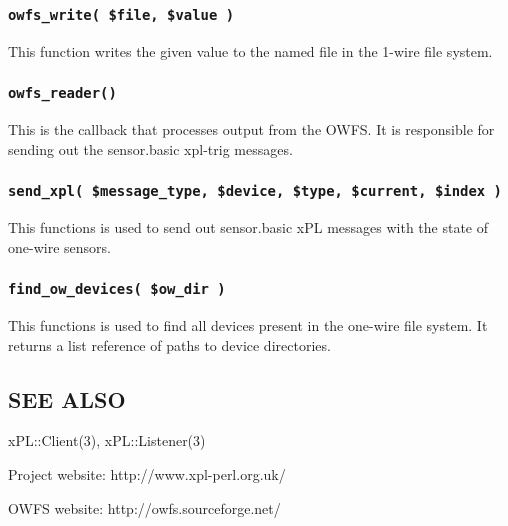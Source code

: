 \subsubsection*{\texttt{owfs\_write( \$file, \$value )}\label{xpl-owfs_owfs_write_file_value_}}


This function writes the given value to the named file in the 1-wire
file system.

\subsubsection*{\texttt{owfs\_reader()}\label{xpl-owfs_owfs_reader_}}


This is the callback that processes output from the OWFS.  It is
responsible for sending out the sensor.basic xpl-trig messages.

\subsubsection*{\texttt{send\_xpl( \$message\_type, \$device, \$type, \$current, \$index )}\label{xpl-owfs_send_xpl_message_type_device_type_current_index_}}


This functions is used to send out sensor.basic xPL messages with
the state of one-wire sensors.

\subsubsection*{\texttt{find\_ow\_devices( \$ow\_dir )}\label{xpl-owfs_find_ow_devices_ow_dir_}}


This functions is used to find all devices present in the one-wire
file system.  It returns a list reference of paths to device
directories.

\subsection*{SEE ALSO\label{xpl-owfs_SEE_ALSO}}


xPL::Client(3), xPL::Listener(3)



Project website: http://www.xpl-perl.org.uk/



OWFS website: http://owfs.sourceforge.net/


